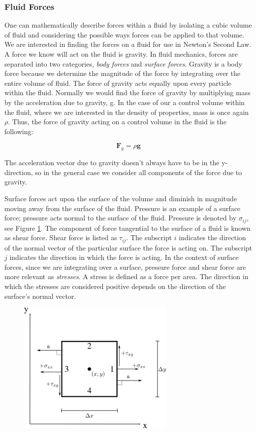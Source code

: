 \documentclass[twocolumn,12pth]{article}
\begin{document}
\subsubsection{Fluid Forces}

One can mathematically describe forces within a fluid by isolating a cubic volume of fluid and considering the possible ways forces can be applied to that volume. 
We are interested in finding the forces on a fluid for use in Newton's Second Law.
A force we know will act on the fluid is gravity.
In fluid mechanics, forces are separated into two categories, \textit{body forces} and \textit{surface forces}.
Gravity is a body force because we determine the magnitude of the force by integrating over the entire volume of fluid.
The force of gravity acts equally upon every particle within the fluid.
Normally we would find the force of gravity by multiplying mass by the acceleration due to gravity, g.
In the case of our a control volume within the fluid, where we are interested in the density of properties, mass is once again $\rho$.
Thus, the force of gravity acting on a control volume in the fluid is the following:

\begin{equation}
\mathbf{F}_g = \rho\mathbf{g}
\end{equation}

The acceleration vector due to gravity doesn't always have to be in the y-direction, so in the general case we consider all components of the force due to gravity.

Surface forces act upon the surface of the volume and diminish in magnitude moving away from the surface of the fluid.
Pressure is an example of a surface force; pressure acts normal to the surface of the fluid.
Pressure is denoted by $\sigma_{ij}$, see Figure \ref{fig:stresses}.
The component of force tangential to the surface of a fluid is known as shear force.
Shear force is listed as $\tau_{ij}$.
The subscript $i$ indicates the direction of the normal vector of the particular surface the force is acting on.
The subscript $j$ indicates the direction in which the force is acting.
In the context of surface forces, since we are integrating over a surface, pressure force and shear force are more relevant as \textit{stresses}.
A stress is defined as a force per area.
The direction in which the stresses are considered positive depends on the direction of the surface's normal vector.

\begin{figure}
\includegraphics[width=3.0in]{stresses.png}
\centering
{}
\label{fig:stresses}
\end{figure}
\end{document}
